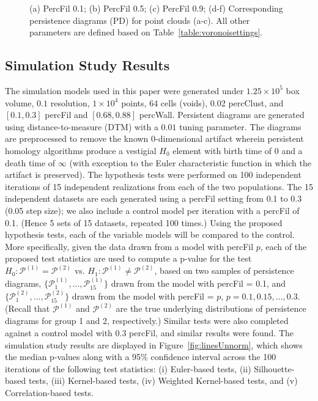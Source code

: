 \documentclass[12pt]{article}
\newcommand{\figref}[1]{Figure~\ref{#1}}
\begin{document}
\begin{center}
\begin{figure}[htp!]
\begin{subfigure}{.32\textwidth}
      \label{fig:percfil09pd}
    \end{subfigure}
      \caption{(a) PercFil 0.1; (b) PercFil 0.5; (c) PercFil 0.9; (d-f) Corresponding persistence diagrams (PD) for point clouds (a-c). All other parameters are defined based on Table~\ref{table:voronoisettings}.}
      \label{fig:percfilexample}
  \end{figure}
\end{center}

\subsection{Simulation Study Results} \label{sec:results1} %
The simulation models used in this paper were generated under $1.25 \times  10^{5}$ box volume, $0.1$ resolution, $1 \times  10^{4}$ points, $64$ cells (voids), 0.02 percClust, and $[0.1, 0.3]$ percFil and $[0.68, 0.88]$ percWall. Persistent diagrams are generated using distance-to-measure (DTM) with a $0.01$ tuning parameter. The diagrams are preprocessed to remove the known 0-dimensional artifact wherein persistent homology algorithms produce a vestigial $H_{0}$ element with birth time of 0 and a death time of $\infty$ (with exception to the Euler characteristic function in which the artifact is preserved).  
The hypothesis tests were performed on 100 independent iterations of 15 independent realizations from each of the two populations. The 15 independent datasets are each generated using a percFil setting from 0.1 to 0.3 (0.05 step size); we also include a control model per iteration with a percFil of 0.1. (Hence 5 sets of 15 datasets, repeated 100 times.) Using the proposed hypothesis tests, each of the variable models will be compared to the control. More specifically, given the data drawn from a model with percFil $p$, each of the proposed test statistics are used to compute a p-value for the test $H_0: \mathcal 
P^{(1)} = \mathcal P^{(2)}$ vs. $H_1: \mathcal P^{(1)} \neq \mathcal P^{(2)}$, 
based on two samples of persistence diagrams, $\{\mathcal 
P_1^{(1)}, \ldots, \mathcal P_{15}^{(1)}\}$ drawn from the model with percFil = 0.1, and $\{\mathcal P_1^{(2)}, \ldots, 
\mathcal P_{15}^{(2)}\}$ drawn from the model with percFil = $p$, $p = 0.1, 0.15, \ldots, 0.3$.  
(Recall that $\mathcal P^{(1)}$ and $\mathcal P^{(2)}$ are the true underlying 
distributions of persistence diagrams for group 1 and 2, respectively.)  
Similar tests were also completed against a control model with 0.3 percFil, and similar results were found. The simulation study results are displayed in \figref{fig:linesUnnorm}, which shows the median p-values along with a 95\% confidence interval across the 100 iterations of the following test statistics: (i) Euler-based tests, (ii) Silhouette-based tests, (iii) Kernel-based tests, (iv) Weighted Kernel-based tests, and (v) Correlation-based tests.
\end{document}
